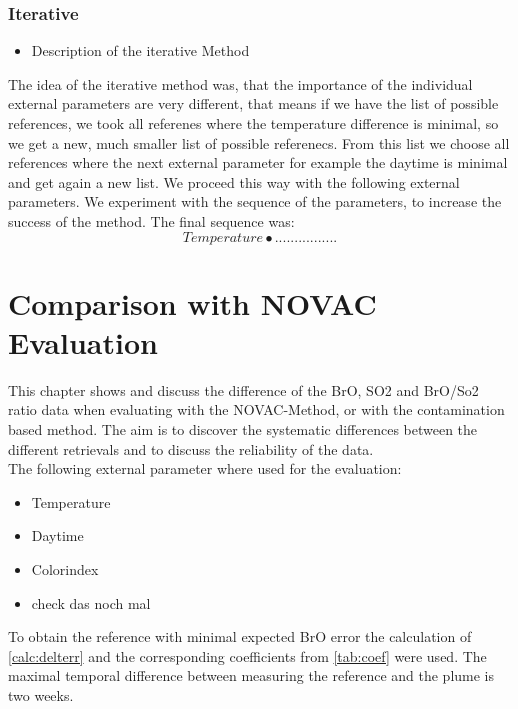 \documentclass  [
  paper    = a4,
  BCOR     = 10mm,
  twoside,
  fontsize = 12pt,
  fleqn,
  toc      = bibnumbered,
  toc      = listofnumbered,
  numbers  = noendperiod,
  headings = normal,
  listof   = leveldown,
  version  = 3.03
]                                       {scrreprt}
\begin{document}
	\subsection{Iterative}
	\begin{itemize}
		\item Description of the iterative Method
	\end{itemize}
	The idea of the iterative method was, that the importance of the individual external parameters are very different, that means if we have the list of possible references, we took all referenes where the temperature difference is minimal, so we get a new, much smaller list of possible referenecs. From this list we choose all references where the next external parameter for example the daytime is minimal and get again a new list. We proceed this way with the following external parameters. We experiment with the sequence of the parameters, to increase the success of the method. The final sequence was:
	\begin{equation*}
	Temperature \bullet ................
	\end{equation*} 
	
	\chapter{Comparison with NOVAC Evaluation}
	This chapter shows and discuss the difference of the BrO, SO2 and BrO/So2 ratio data when evaluating with the NOVAC-Method, or with the contamination based method.
	The aim is to discover the systematic differences between the different retrievals and to discuss the reliability of the data.\\
	The following external parameter where used for the evaluation:
	\begin{itemize}
		\item Temperature
		\item Daytime
		\item Colorindex
		\item check das noch mal
	\end{itemize}
	To obtain the reference with minimal expected  BrO error the calculation of \cref{calc:delterr} and the corresponding coefficients from \cref{tab:coef} were used. The maximal temporal difference between measuring the reference and the plume is two weeks.
	
	
	
	
\end{document}
